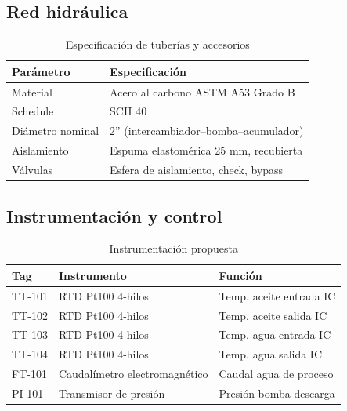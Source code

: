 \documentclass[11pt,a4paper]{article}
\begin{document}
\subsection{Red hidráulica}

\begin{table}[H]
\centering
\caption{Especificación de tuberías y accesorios}
\begin{tabular}{@{}ll@{}}
\toprule
\textbf{Parámetro} & \textbf{Especificación} \\
\midrule
Material & Acero al carbono ASTM A53 Grado B \\
Schedule & SCH 40 \\
Diámetro nominal & 2'' (intercambiador--bomba--acumulador) \\
Aislamiento & Espuma elastomérica 25 mm, recubierta \\
Válvulas & Esfera de aislamiento, check, bypass \\
\bottomrule
\end{tabular}
\end{table}

\subsection{Instrumentación y control}

\begin{table}[H]
\centering
\caption{Instrumentación propuesta}
\begin{tabular}{@{}lll@{}}
\toprule
\textbf{Tag} & \textbf{Instrumento} & \textbf{Función} \\
\midrule
TT-101 & RTD Pt100 4-hilos & Temp. aceite entrada IC \\
TT-102 & RTD Pt100 4-hilos & Temp. aceite salida IC \\
TT-103 & RTD Pt100 4-hilos & Temp. agua entrada IC \\
TT-104 & RTD Pt100 4-hilos & Temp. agua salida IC \\
FT-101 & Caudalímetro electromagnético & Caudal agua de proceso \\
PI-101 & Transmisor de presión & Presión bomba descarga \\
\bottomrule
\end{tabular}
\end{table}

\newpage

\end{document}
